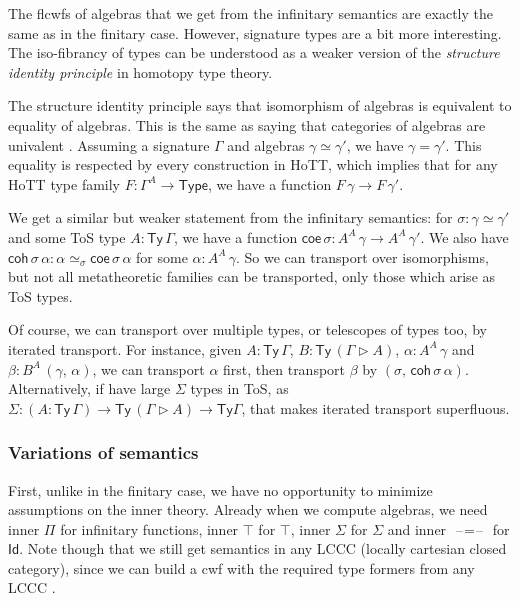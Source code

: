\documentclass[12pt,a4paper,twoside,openany]{book}
\theoremstyle{remark}
\theoremstyle{definition}
\theoremstyle{theorem}
\newcommand{\ms}[1]{\mathsf{#1}}
\newcommand{\Ty}{\mathsf{Ty}}
\newcommand{\Id}{\mathsf{Id}}
\newcommand{\blank}{\mathord{\hspace{1pt}\text{--}\hspace{1pt}}}
\newcommand{\ext}{\triangleright}
\newcommand{\coe}{\mathsf{coe}}
\newcommand{\coh}{\mathsf{coh}}
\begin{document}
The flcwfs of algebras that we get from the infinitary semantics are exactly the
same as in the finitary case. However, signature types are a bit more
interesting. The iso-fibrancy of types can be understood as a weaker version of
the \emph{structure identity principle} in homotopy type theory.

The structure identity principle says that isomorphism of algebras is equivalent
to equality of algebras. This is the same as saying that categories of algebras
are univalent \cite{univalent-categories}. Assuming a signature $\Gamma$ and
algebras $\gamma \simeq \gamma'$, we have $\gamma = \gamma'$. This equality is
respected by every construction in HoTT, which implies that for any HoTT type
family $F : \Gamma^A \to \ms{Type}$, we have a function $F\,\gamma \to
F\,\gamma'$.

We get a similar but weaker statement from the infinitary semantics: for $\sigma
: \gamma \simeq \gamma'$ and some ToS type $A : \Ty\,\Gamma$, we have a function
$\coe\,\sigma : A^A\,\gamma \to A^A\,\gamma'$. We also have
$\coh\,\sigma\,\alpha : \alpha \simeq_{\sigma} \coe\,\sigma\,\alpha$ for some
$\alpha : A^A\,\gamma$. So we can transport over isomorphisms, but not all
metatheoretic families can be transported, only those which arise as ToS types.

Of course, we can transport over multiple types, or telescopes of types too, by
iterated transport. For instance, given $A : \Ty\,\Gamma$, $B : \Ty\,(\Gamma
\ext A)$, $\alpha : A^A\,\gamma$ and $\beta : B^A\,(\gamma,\,\alpha)$, we can
transport $\alpha$ first, then transport $\beta$ by
$(\sigma,\,\coh\,\sigma\,\alpha)$.  Alternatively, if have large $\Sigma$ types
in ToS, as $\Sigma : (A : \Ty\,\Gamma) \to \Ty\,(\Gamma \ext A) \to \Ty \Gamma$,
that makes iterated transport superfluous.

\subsubsection{Variations of semantics}

First, unlike in the finitary case, we have no opportunity to minimize
assumptions on the inner theory. Already when we compute algebras, we need inner
$\Pi$ for infinitary functions, inner $\top$ for $\top$, inner $\Sigma$ for
$\Sigma$ and inner $\blank\!=\!\blank$ for $\Id$. Note though that we still get
semantics in any LCCC (locally cartesian closed category), since we can build a
cwf with the required type formers from any LCCC
\cite{clairambault2014biequivalence}.
\end{document}
